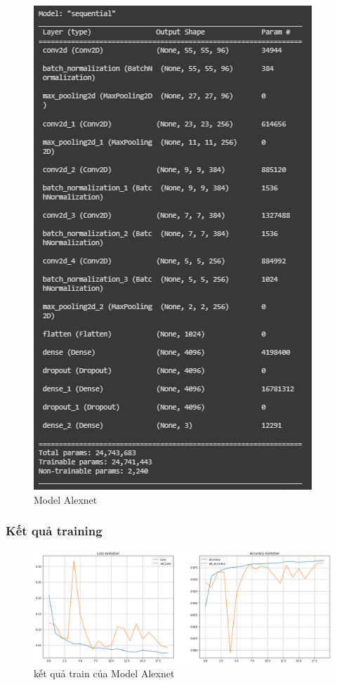 \begin{center}
    \begin{figure}[!h]
        \centering
        \includegraphics[scale = 1.05]{fileanh/33.jpg}
        \caption{Model Alexnet}
    \end{figure}
\end{center}



\subsubsection{Kết quả training}\newpage
\begin{center}
    \begin{figure}[!h]
        \centering
        \includegraphics[scale = 0.37]{fileanh/Alexnet.png}
        \caption{kết quả train của Model Alexnet}
    \end{figure}
\end{center}
